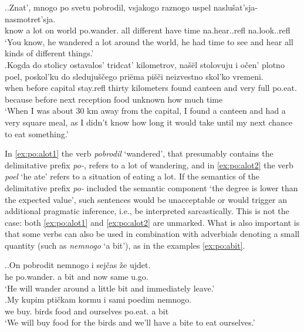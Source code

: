 \ex.\label{ex:po:alot}\ag.\label{ex:po:alot1}Znat', mnogo po svetu pobrodil, vsjakogo raznogo uspel {naslu\v{s}at'sja-} {nasmotret'sja.}\\
know {a lot} on world po.wander. all different {have time} na.hear..refl na.look..refl\\
\trans `You know, he wandered a lot around the world, he had time to see and hear all kinds of different things.'\\
\bg.\label{ex:po:alot2}Kogda do stolicy ostavalos' tridcat' kilometrov, na\v{s}\"{e}l stolovuju i o\v{c}en' plotno poel, poskol'ku do sleduju\v{s}\v{c}ego pri\"{e}ma pi\v{s}\v{c}i neizvestno skol'ko vremeni.\\
when before capital stay.refl thirty kilometers found canteen and very full po.eat. because before next reception food unknown {how much} time\\
\trans `When I was about 30 km away from the capital, I found a canteen and had a very square meal, as I didn't know how long it would take until my next chance to eat something.'\\

In \ref{ex:po:alot1} the verb \textit{pobrodil} `wandered', that presumably contains the delimitative prefix \textit{po-}, refers to a lot of wandering, and in \ref{ex:po:alot2} the verb \textit{poel} `he ate' refers to a situation of eating a lot. If the semantics of the delimitative prefix \textit{po-} included the semantic component `the degree is lower than the expected value', such sentences would be unacceptable or would trigger an additional pragmatic inference, i.e., be interpreted sarcastically. This is not the case: both \ref{ex:po:alot1} and \ref{ex:po:alot2} are unmarked. What is also important is that some verbs can also be used in combination with adverbials denoting a small quantity (such as \textit{nemnogo} `a bit'), as in the examples \ref{ex:po:abit}.

\ex.\label{ex:po:abit}\ag.On pobrodit nemnogo i sej\v{c}as \v{z}e ujdet.\\
he po.wander. {a bit} and now same u.go.\\
\trans `He will wander around a little bit and immediately leave.'\\
\bg.My kupim pti\v{c}kam kormu i sami poedim nemnogo.\\
we buy. birds food and ourselves po.eat. {a bit}\\
\trans `We will buy food for the birds and we'll have a bite to eat ourselves.'\\

